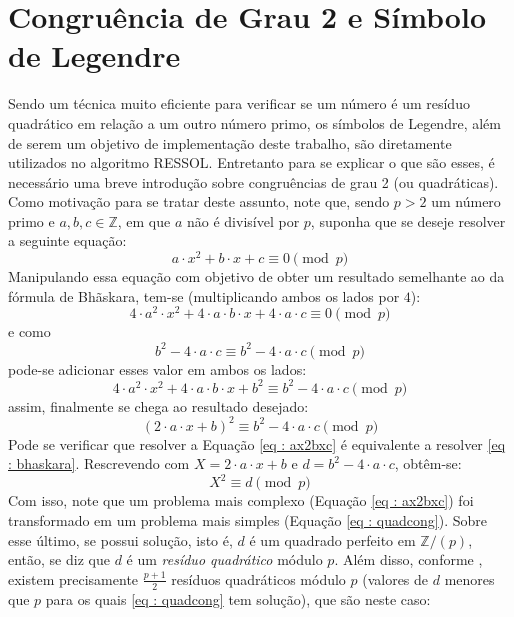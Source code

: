 \section{Congruência de Grau 2 e Símbolo de Legendre}
Sendo um técnica muito eficiente para verificar se um número é um resíduo quadrático em relação a um outro número primo, os símbolos de Legendre, além de serem um objetivo de implementação deste trabalho, são diretamente utilizados no algoritmo RESSOL. Entretanto para se explicar o que são esses, é necessário uma breve introdução sobre congruências de grau 2 (ou quadráticas).
Como motivação para se tratar deste assunto, note que, sendo $p > 2$ um número primo e $a, b, c \in \mathbb{Z}$, em que $a$ não é divisível por $p$, suponha que se deseje resolver a seguinte equação:
\begin{equation} \label{eq : ax2bxc}
    a \cdot x^2 + b \cdot x + c \equiv 0 \pmod p
\end{equation}
Manipulando essa equação com objetivo de obter um resultado semelhante ao da fórmula de Bhãskara, tem-se (multiplicando ambos os lados por $4$):
\begin{equation*}
    4 \cdot a^2 \cdot x^2 + 4 \cdot a \cdot b \cdot x + 4 \cdot a \cdot c \equiv 0 \pmod p
\end{equation*}
e como 
\begin{equation*}
    b^2 - 4 \cdot a \cdot c \equiv b^2 - 4 \cdot a \cdot c \pmod p
\end{equation*}
pode-se adicionar esses valor em ambos os lados:
\begin{equation*}
    4 \cdot a^2 \cdot x^2 + 4 \cdot a \cdot b \cdot x + b^2 \equiv b^2 - 4 \cdot a \cdot c \pmod p
\end{equation*}
assim, finalmente se chega ao resultado desejado:
\begin{equation} \label{eq : bhaskara}
    (2 \cdot a \cdot x + b)^2 \equiv b^2 - 4 \cdot a \cdot c \pmod p
\end{equation}
Pode se verificar que resolver a Equação \ref{eq : ax2bxc}  é equivalente a resolver \ref{eq : bhaskara}. Rescrevendo com $X = 2 \cdot a \cdot x + b$ e $d = b^2 - 4 \cdot a \cdot c$, obtêm-se:
\begin{equation} \label{eq : quadcong}
    X^2 \equiv d \pmod p
\end{equation}
Com isso, note que um problema mais complexo (Equação \ref{eq : ax2bxc}) foi transformado em um problema mais simples (Equação \ref{eq : quadcong}). Sobre esse último, se possui solução, isto é, $d$ é um quadrado perfeito em $\mathbb{Z}/(p)$, então, se diz que $d$ é um \textit{resíduo quadrático} módulo $p$. Além disso, conforme \cite[p.~86]{book:2399854}, existem precisamente $\frac{p+1}{2}$ resíduos quadráticos módulo $p$ (valores de $d$ menores que $p$ para os quais \ref{eq : quadcong} tem solução), que são neste caso:
